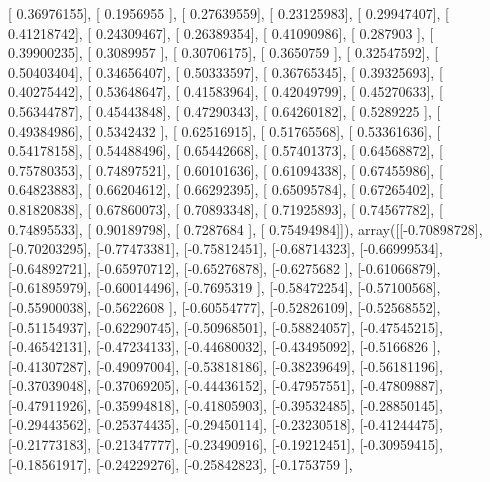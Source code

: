 \documentclass{article}
\begin{document}
       [ 0.36976155],
       [ 0.1956955 ],
       [ 0.27639559],
       [ 0.23125983],
       [ 0.29947407],
       [ 0.41218742],
       [ 0.24309467],
       [ 0.26389354],
       [ 0.41090986],
       [ 0.287903  ],
       [ 0.39900235],
       [ 0.3089957 ],
       [ 0.30706175],
       [ 0.3650759 ],
       [ 0.32547592],
       [ 0.50403404],
       [ 0.34656407],
       [ 0.50333597],
       [ 0.36765345],
       [ 0.39325693],
       [ 0.40275442],
       [ 0.53648647],
       [ 0.41583964],
       [ 0.42049799],
       [ 0.45270633],
       [ 0.56344787],
       [ 0.45443848],
       [ 0.47290343],
       [ 0.64260182],
       [ 0.5289225 ],
       [ 0.49384986],
       [ 0.5342432 ],
       [ 0.62516915],
       [ 0.51765568],
       [ 0.53361636],
       [ 0.54178158],
       [ 0.54488496],
       [ 0.65442668],
       [ 0.57401373],
       [ 0.64568872],
       [ 0.75780353],
       [ 0.74897521],
       [ 0.60101636],
       [ 0.61094338],
       [ 0.67455986],
       [ 0.64823883],
       [ 0.66204612],
       [ 0.66292395],
       [ 0.65095784],
       [ 0.67265402],
       [ 0.81820838],
       [ 0.67860073],
       [ 0.70893348],
       [ 0.71925893],
       [ 0.74567782],
       [ 0.74895533],
       [ 0.90189798],
       [ 0.7287684 ],
       [ 0.75494984]]), array([[-0.70898728],
       [-0.70203295],
       [-0.77473381],
       [-0.75812451],
       [-0.68714323],
       [-0.66999534],
       [-0.64892721],
       [-0.65970712],
       [-0.65276878],
       [-0.6275682 ],
       [-0.61066879],
       [-0.61895979],
       [-0.60014496],
       [-0.7695319 ],
       [-0.58472254],
       [-0.57100568],
       [-0.55900038],
       [-0.5622608 ],
       [-0.60554777],
       [-0.52826109],
       [-0.52568552],
       [-0.51154937],
       [-0.62290745],
       [-0.50968501],
       [-0.58824057],
       [-0.47545215],
       [-0.46542131],
       [-0.47234133],
       [-0.44680032],
       [-0.43495092],
       [-0.5166826 ],
       [-0.41307287],
       [-0.49097004],
       [-0.53818186],
       [-0.38239649],
       [-0.56181196],
       [-0.37039048],
       [-0.37069205],
       [-0.44436152],
       [-0.47957551],
       [-0.47809887],
       [-0.47911926],
       [-0.35994818],
       [-0.41805903],
       [-0.39532485],
       [-0.28850145],
       [-0.29443562],
       [-0.25374435],
       [-0.29450114],
       [-0.23230518],
       [-0.41244475],
       [-0.21773183],
       [-0.21347777],
       [-0.23490916],
       [-0.19212451],
       [-0.30959415],
       [-0.18561917],
       [-0.24229276],
       [-0.25842823],
       [-0.1753759 ],
\end{document}
